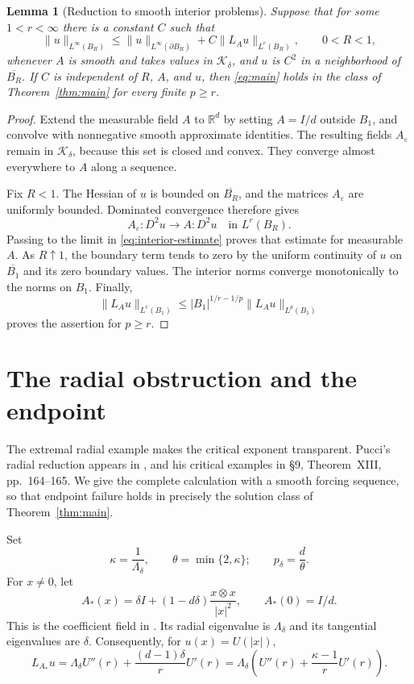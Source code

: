 \documentclass[11pt,a4paper,reqno]{amsart}
\theoremstyle{plain}
\newtheorem{lemma}[theorem]{Lemma}
\theoremstyle{remark}
\numberwithin{equation}{section}
\newcommand{\R}{\mathbb R}
\newcommand{\Kdelta}{\mathcal K_\delta}
\newcommand{\lam}{\Lambda_\delta}
\newcommand{\pcrit}{p_\delta}
\newcommand{\norm}[1]{\lVert#1\rVert}
\begin{document}
\begin{lemma}[Reduction to smooth interior problems]\label{lem:localization}
Suppose that for some $1<r<\infty$ there is a constant $C$ such that
\begin{equation}\label{eq:interior-estimate}
 \norm{u}_{L^\infty(B_R)}
 \le \norm{u}_{L^\infty(\partial B_R)}
       +C\norm{L_Au}_{L^r(B_R)},\qquad 0<R<1,
\end{equation}
whenever $A$ is smooth and takes values in $\Kdelta$, and $u$ is $C^2$ in a neighborhood of $\overline{B_R}$. If $C$ is independent of $R$, $A$, and $u$, then \eqref{eq:main} holds in the class of Theorem~\ref{thm:main} for every finite $p\ge r$.
\end{lemma}
\begin{proof}
Extend the measurable field $A$ to $\R^d$ by setting $A=I/d$ outside $B_1$, and convolve with nonnegative smooth approximate identities. The resulting fields $A_\varepsilon$ remain in $\Kdelta$, because this set is closed and convex. They converge almost everywhere to $A$ along a sequence.

Fix $R<1$. The Hessian of $u$ is bounded on $\overline{B_R}$, and the matrices $A_\varepsilon$ are uniformly bounded. Dominated convergence therefore gives
\[
 A_\varepsilon:D^2u\longrightarrow A:D^2u
 \quad\text{in }L^r(B_R).
\]
Passing to the limit in \eqref{eq:interior-estimate} proves that estimate for measurable $A$. As $R\uparrow1$, the boundary term tends to zero by the uniform continuity of $u$ on $\overline{B_1}$ and its zero boundary values. The interior norms converge monotonically to the norms on $B_1$. Finally,
\[
 \norm{L_Au}_{L^r(B_1)}
 \le |B_1|^{1/r-1/p}\norm{L_Au}_{L^p(B_1)}
\]
proves the assertion for $p\ge r$.
\end{proof}

\section{The radial obstruction and the endpoint}\label{sec:radial}
The extremal radial example makes the critical exponent transparent. Pucci's radial reduction appears in \cite[\S5, equations~(30)--(36), pp.~153--154]{PucciExtremal1966}, and his critical examples in \S9, Theorem~XIII, pp.~164--165. We give the complete calculation with a smooth forcing sequence, so that endpoint failure holds in precisely the solution class of Theorem~\ref{thm:main}.

Set
\[
 \kappa=\frac1{\lam},\qquad \theta=\min\{2,\kappa\};
 \qquad \pcrit=\frac d\theta.
\]
For $x\ne0$, let
\begin{equation}\label{eq:radial-field}
 A_*(x)=\delta I+(1-d\delta)\frac{x\otimes x}{|x|^2},
 \qquad A_*(0)=I/d.
\end{equation}
This is the coefficient field in \cite[\S9, equation~(86), p.~167]{PucciExtremal1966}. Its radial eigenvalue is $\lam$ and its tangential eigenvalues are $\delta$. Consequently, for $u(x)=U(|x|)$,
\begin{equation}\label{eq:radial-ode}
 L_{A_*}u
 =\lam U''(r)+\frac{(d-1)\delta}{r}U'(r)
 =\lam\left(U''(r)+\frac{\kappa-1}{r}U'(r)\right).
\end{equation}
\end{document}
